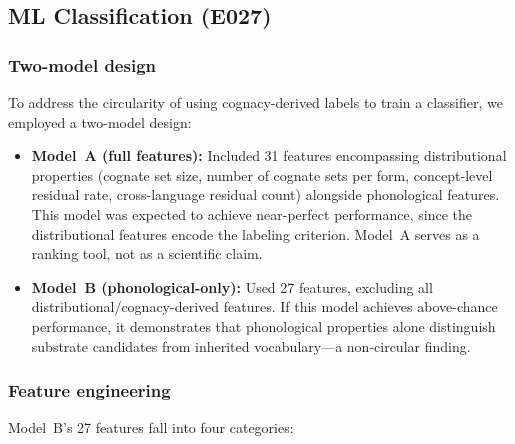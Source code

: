 \documentclass[12pt]{article}
\begin{document}
\subsection{ML Classification (E027)}
\label{sec:ml}

\subsubsection{Two-model design}

To address the circularity of using cognacy-derived labels to train a classifier, we employed a two-model design:

\begin{itemize}
    \item \textbf{Model~A (full features):} Included 31 features encompassing distributional properties (cognate set size, number of cognate sets per form, concept-level residual rate, cross-language residual count) alongside phonological features. This model was expected to achieve near-perfect performance, since the distributional features encode the labeling criterion. Model~A serves as a ranking tool, not as a scientific claim.
    \item \textbf{Model~B (phonological-only):} Used 27 features, excluding all distributional/cognacy-derived features. If this model achieves above-chance performance, it demonstrates that phonological properties alone distinguish substrate candidates from inherited vocabulary---a non-circular finding.
\end{itemize}

\subsubsection{Feature engineering}

Model~B's 27 features fall into four categories:
\end{document}
